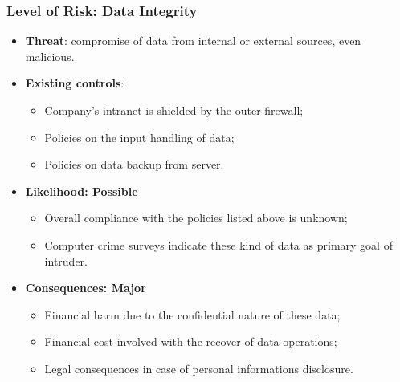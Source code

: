 \documentclass[xcolor ={table,usenames,dvipsnames}]{beamer}
\theoremstyle{definition}
\begin{document}
	\begin{frame}
		\frametitle{Level of Risk: Data Integrity}
		\begin{itemize}
			\item \textbf{Threat}: compromise of data from internal or external sources, even malicious.
			\item \textbf{Existing controls}: 
			\begin{itemize}
				\item Company's intranet is shielded by the outer firewall;
				\item Policies on the input handling of data;
				\item Policies on data backup from server.
			\end{itemize} 
			\item \textbf{Likelihood: Possible }
			\begin{itemize}
				\item Overall compliance with the policies listed above is unknown;
				\item Computer crime surveys indicate these kind of data as primary goal of intruder. 
			\end{itemize}	
			\item \textbf{Consequences: Major}
			\begin{itemize}
				\item Financial harm due to the confidential nature of these data;
				\item Financial cost involved with the recover of data operations;
				\item Legal consequences in case of personal informations disclosure.
			\end{itemize}
		\end{itemize}
	\end{frame}
\end{document}
